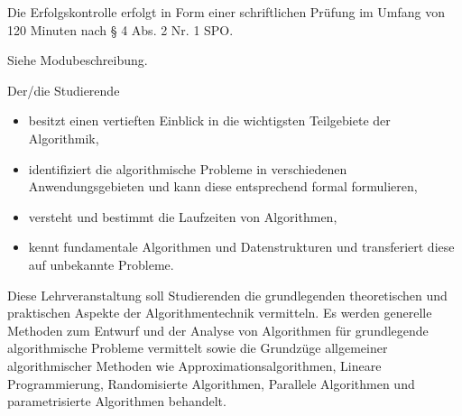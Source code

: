 \begin{course}

\setdoclanguagegerman
{}



\coursehead


\label{cour_8653.dp_997}


\begin{styleenv}
\begin{assessment}
Die Erfolgskontrolle erfolgt in Form einer schriftlichen Prüfung im Umfang von 120 Minuten nach § 4 Abs. 2 Nr. 1 SPO.


\end{assessment}

\begin{conditions}Siehe Modubeschreibung.

\end{conditions}


\end{styleenv}

\begin{learningoutcomes}
Der/die Studierende

 \begin{itemize}\item besitzt einen vertieften Einblick in die wichtigsten Teilgebiete der Algorithmik,  \item identifiziert die algorithmische Probleme in verschiedenen Anwendungsgebieten und kann diese entsprechend formal formulieren,  \item versteht und bestimmt die Laufzeiten von Algorithmen,  \item kennt fundamentale Algorithmen und Datenstrukturen und transferiert diese auf unbekannte Probleme.  \end{itemize}
\end{learningoutcomes}

\begin{content}
Diese Lehrveranstaltung soll Studierenden die grundlegenden theoretischen und praktischen Aspekte der Algorithmentechnik vermitteln. Es werden generelle Methoden zum Entwurf und der Analyse von Algorithmen für grundlegende algorithmische Probleme vermittelt sowie die Grundzüge allgemeiner algorithmischer Methoden wie Approximationsalgorithmen, Lineare Programmierung, Randomisierte Algorithmen, Parallele Algorithmen und parametrisierte Algorithmen behandelt.



\end{content}
\end{course}

